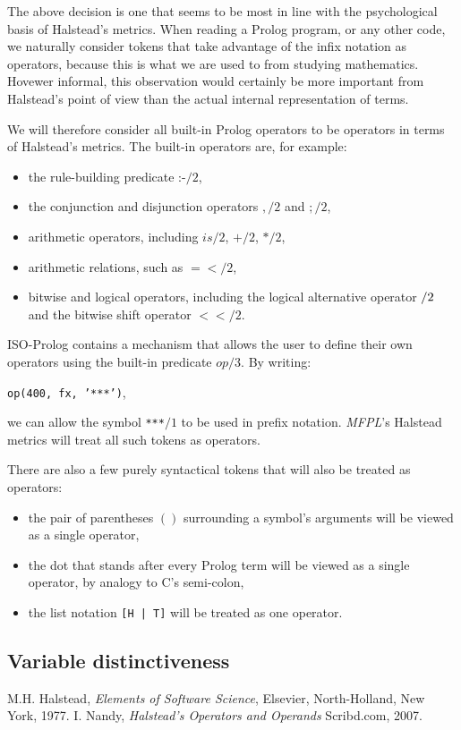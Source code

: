 \documentclass[11pt,a4paper,twoside]{article}
\newcommand{\pname}{\emph{MFPL}}
\begin{document}
\begin{multicols}{2}
The above decision is one that seems to be most in line with the
psychological basis of Halstead's metrics. When reading a Prolog
program, or any other code, we naturally consider tokens that take
advantage of the infix notation as operators, because this is what we
are used to from studying mathematics. Hovewer informal, this
observation would certainly be more important from Halstead's point of
view than the actual internal representation of terms.

We will therefore consider all built-in Prolog operators to be
operators in terms of Halstead's metrics. The built-in operators are,
for example:
\begin{itemize}
\item the rule-building predicate :-$/2$,
\item the conjunction and disjunction operators $,/2$ and $;/2$,
\item arithmetic operators, including $is/2$, $+/2$, $*/2$, 
\item arithmetic relations, such as $=</2$, 
\item bitwise and logical operators, including the logical alternative
  operator $\//2$ and the bitwise shift operator $<</2$.
\end{itemize}

ISO-Prolog contains a mechanism that allows the user to define their
own operators using the built-in predicate $op/3$. By writing: 
\begin{center}
\texttt{op(400, fx, '***')},
\end{center}
 we can allow the symbol \texttt{***}$/1$ to be used in prefix
notation. \pname's Halstead metrics will treat all such tokens as
operators.

There are also a few purely syntactical tokens that will also be
treated as operators:
\begin{itemize}
\item the pair of parentheses $()$ surrounding a symbol's arguments
  will be viewed as a single operator,
\item the dot that stands after every Prolog term will be viewed as a
  single operator, by analogy to C's semi-colon,
\item the list notation \texttt{[H | T]} will be treated as one
  operator.
\end{itemize}

\subsection{Variable distinctiveness}



\end{multicols}

\newpage

\begin{thebibliography}{halstead}
  M.H. Halstead, 
  \emph{Elements of Software Science}, 
  Elsevier, North-Holland, New York, 1977.
  I. Nandy, 
  \emph{Halstead's Operators and Operands}
  Scribd.com, 2007.
\end{thebibliography}
\end{document}
